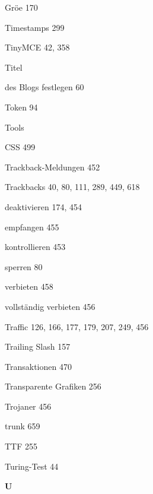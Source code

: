\documentclass{book}
\renewcommand\indexspace{\vspace{11pt}}
\renewcommand\subitem{\par}
\begin{document}
\begin{multicols}{2}
\begin{osp-index}
    \subitem Gr\"o\IeC {\ss }e\hspace{1mm} 170
  \item Timestamps\hspace{1mm} 299
  \item TinyMCE\hspace{1mm} 42, 358
  \item Titel
    \subitem des Blogs festlegen\hspace{1mm} 60
  \item Token\hspace{1mm} 94
  \item Tools
    \subitem CSS\hspace{1mm} 499
  \item Trackback-Meldungen\hspace{1mm} 452
  \item Trackbacks\hspace{1mm} 40, 80, 111, 289, 449, 618
    \subitem deaktivieren\hspace{1mm} 174, 454
    \subitem empfangen\hspace{1mm} 455
    \subitem kontrollieren\hspace{1mm} 453
    \subitem sperren\hspace{1mm} 80
    \subitem verbieten\hspace{1mm} 458
    \subitem vollst\"andig verbieten\hspace{1mm} 456
  \item Traffic\hspace{1mm} 126, 166, 177, 179, 207, 249, 456
  \item Trailing Slash\hspace{1mm} 157
  \item Transaktionen\hspace{1mm} 470
  \item Transparente Grafiken\hspace{1mm} 256
  \item Trojaner\hspace{1mm} 456
  \item trunk\hspace{1mm} 659
  \item TTF\hspace{1mm} 255
  \item Turing-Test\hspace{1mm} 44

  \indexspace
{\sffamily\bfseries U}\nopagebreak


\end{osp-index}
\end{multicols}
\end{document}
